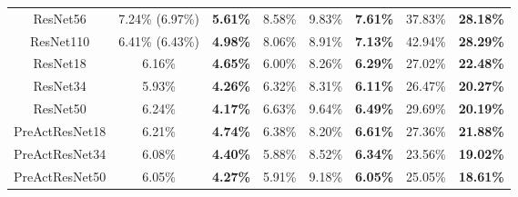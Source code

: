\documentclass{article}
\begin{document}
\begin{table*}[!htbp]
\begin{tabular}{cccccccc}
\footnotesize{ResNet56} 		&\footnotesize{7.24\%} \footnotesize{(6.97\%\cite{ResNet})} & \footnotesize{{\bf 5.61\%}}  &\footnotesize{8.58\%}  &\footnotesize{ 9.83\%}&\footnotesize{{\bf 7.61\%}}   &\footnotesize{37.83\%} &\footnotesize{{\bf 28.18\%}} \\
\footnotesize{ResNet110} 		&\footnotesize{6.41\%} \footnotesize{(6.43\%\cite{ResNet})} & \footnotesize{{\bf 4.98\%}}  &\footnotesize{8.06\%}  &\footnotesize{ 8.91\%}&\footnotesize{{\bf 7.13\%}}   &\footnotesize{42.94\%} &\footnotesize{{\bf 28.29\%}} \\
\footnotesize{ResNet18} 		&\footnotesize{6.16\%} & \footnotesize{{\bf 4.65\%}}  &\footnotesize{6.00\%}  &\footnotesize{8.26\%} &\footnotesize{{\bf 6.29\%}}   &\footnotesize{27.02\%} &\footnotesize{{\bf 22.48\%}} \\
\footnotesize{ResNet34} 		&\footnotesize{5.93\%} & \footnotesize{{\bf 4.26\%}}  &\footnotesize{6.32\%}  &\footnotesize{8.31\%} &\footnotesize{{\bf 6.11\%}}   &\footnotesize{26.47\%} &\footnotesize{{\bf 20.27\%}} \\
\footnotesize{ResNet50} 		&\footnotesize{6.24\%} & \footnotesize{{\bf 4.17\%}}  &\footnotesize{6.63\%}  &\footnotesize{9.64\%} &\footnotesize{{\bf 6.49\%}}   &\footnotesize{29.69\%} &\footnotesize{{\bf 20.19\%}} \\
\footnotesize{PreActResNet18}   &\footnotesize{6.21\%} & \footnotesize{{\bf 4.74\%}}  &\footnotesize{6.38\%}  &\footnotesize{8.20\%} &\footnotesize{{\bf 6.61\%}}   &\footnotesize{27.36\%} &\footnotesize{{\bf 21.88\%}} \\
\footnotesize{PreActResNet34} 	&\footnotesize{6.08\%} & \footnotesize{{\bf 4.40\%}}  &\footnotesize{5.88\%}  &\footnotesize{8.52\%} &\footnotesize{{\bf 6.34\%}}   &\footnotesize{23.56\%} &\footnotesize{{\bf 19.02\%}} \\
\footnotesize{PreActResNet50} 	&\footnotesize{6.05\%} & \footnotesize{{\bf 4.27\%}}  &\footnotesize{5.91\%}  &\footnotesize{9.18\%} &\footnotesize{{\bf 6.05\%}}   &\footnotesize{25.05\%} &\footnotesize{{\bf 18.61\%}} \\
\bottomrule
\end{tabular}
\end{table*}
\end{document}
